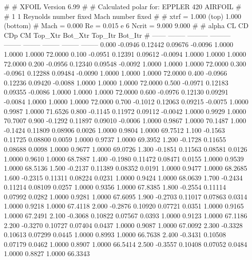 #  
#       XFOIL         Version 6.99
#  
# Calculated polar for: EPPLER 420 AIRFOIL                              
#  
# 1 1 Reynolds number fixed          Mach number fixed         
#  
# xtrf =   1.000 (top)        1.000 (bottom)  
# Mach =   0.000     Re =     0.015 e 6     Ncrit =   9.000  9.000
#  
#   alpha    CL        CD       CDp       CM     Top_Xtr  Bot_Xtr  Top_Itr  Bot_Itr
#  ------ -------- --------- --------- -------- -------- -------- -------- --------
   0.000  -0.0946   0.12442   0.09676  -0.0096   1.0000   1.0000   1.0000  72.0000
   0.100  -0.0951   0.12391   0.09612  -0.0094   1.0000   1.0000   1.0000  72.0000
   0.200  -0.0956   0.12340   0.09548  -0.0092   1.0000   1.0000   1.0000  72.0000
   0.300  -0.0961   0.12288   0.09484  -0.0090   1.0000   1.0000   1.0000  72.0000
   0.400  -0.0966   0.12236   0.09420  -0.0088   1.0000   1.0000   1.0000  72.0000
   0.500  -0.0971   0.12183   0.09355  -0.0086   1.0000   1.0000   1.0000  72.0000
   0.600  -0.0976   0.12130   0.09291  -0.0084   1.0000   1.0000   1.0000  72.0000
   0.700  -0.1012   0.12063   0.09215  -0.0075   1.0000   0.9987   1.0000  71.6526
   0.800  -0.1145   0.11972   0.09112  -0.0042   1.0000   0.9929   1.0000  70.7007
   0.900  -0.1292   0.11897   0.09010  -0.0006   1.0000   0.9867   1.0000  70.1487
   1.000  -0.1424   0.11809   0.08906   0.0026   1.0000   0.9804   1.0000  69.7512
   1.100  -0.1563   0.11725   0.08800   0.0059   1.0000   0.9737   1.0000  69.3952
   1.200  -0.1728   0.11655   0.08688   0.0098   1.0000   0.9677   1.0000  69.0726
   1.300  -0.1851   0.11563   0.08581   0.0126   1.0000   0.9610   1.0000  68.7887
   1.400  -0.1980   0.11472   0.08471   0.0155   1.0000   0.9539   1.0000  68.5136
   1.500  -0.2137   0.11389   0.08352   0.0191   1.0000   0.9477   1.0000  68.2685
   1.600  -0.2315   0.11311   0.08224   0.0231   1.0000   0.9424   1.0000  68.0639
   1.700  -0.2434   0.11214   0.08109   0.0257   1.0000   0.9356   1.0000  67.8385
   1.800  -0.2554   0.11114   0.07992   0.0282   1.0000   0.9281   1.0000  67.6095
   1.900  -0.2703   0.11017   0.07863   0.0314   1.0000   0.9218   1.0000  67.4118
   2.000  -0.2876   0.10920   0.07721   0.0351   1.0000   0.9165   1.0000  67.2491
   2.100  -0.3068   0.10822   0.07567   0.0393   1.0000   0.9123   1.0000  67.1186
   2.200  -0.3270   0.10727   0.07404   0.0437   1.0000   0.9087   1.0000  67.0092
   2.300  -0.3328   0.10613   0.07299   0.0445   1.0000   0.8993   1.0000  66.7638
   2.400  -0.3431   0.10508   0.07179   0.0462   1.0000   0.8907   1.0000  66.5414
   2.500  -0.3557   0.10408   0.07052   0.0484   1.0000   0.8827   1.0000  66.3343
